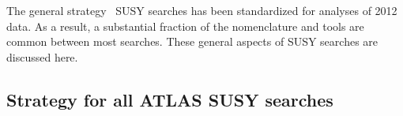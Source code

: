 

The general strategy \atlas\ SUSY searches has been standardized for analyses of 2012 data. As a result, a substantial fraction of the nomenclature and tools are common between most searches. These general aspects of SUSY searches are discussed here.

\subsection{Strategy for all ATLAS SUSY searches}

